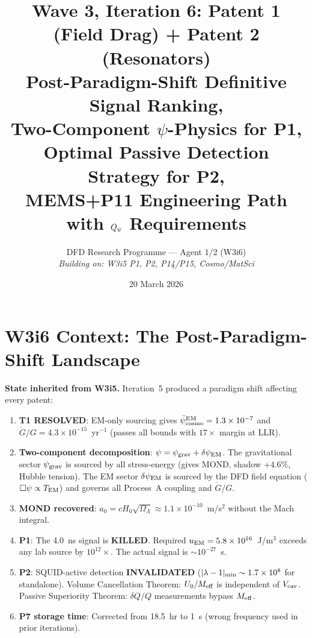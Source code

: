 \documentclass[11pt]{article}
\title{Wave 3, Iteration 6: Patent 1 (Field Drag) + Patent 2 (Resonators)\\
\large Post-Paradigm-Shift Definitive Signal Ranking,\\
Two-Component $\psi$-Physics for P1,\\
Optimal Passive Detection Strategy for P2,\\
MEMS+P11 Engineering Path with $Q_\psi$ Requirements}
\author{DFD Research Programme --- Agent 1/2 (W3i6)\\
\textit{Building on: W3i5 P1, P2, P14/P15, Cosmo/MatSci}}
\date{20 March 2026}
\newcommand{\lam}{\lambda}
\newcommand{\Meff}{M_{\rm eff}}
\newcommand{\ee}[1]{\times 10^{#1}}
\newcommand{\Vcav}{V_{\rm cav}}
\newcommand{\lbone}{|\lam - 1|}
\newcommand{\psicosmo}{\bar{\psi}_{\rm cosmo}}
\newcommand{\psigrav}{\psi_{\rm grav}}
\newcommand{\dpsiEM}{\delta\psi_{\rm EM}}
\theoremstyle{definition}
\theoremstyle{remark}
\begin{document}
\maketitle
\tableofcontents
\newpage

\section*{W3i6 Context: The Post-Paradigm-Shift Landscape}

\noindent\textbf{State inherited from W3i5.}
Iteration~5 produced a paradigm shift affecting every patent:

\begin{enumerate}[nosep]
\item \textbf{T1 RESOLVED}: EM-only sourcing gives
  $\psicosmo^{\rm EM} = 1.3\ee{-7}$ and
  $\dot{G}/G = 4.3\ee{-15}$~yr$^{-1}$ (passes all bounds with $17\times$
  margin at LLR).

\item \textbf{Two-component decomposition}: $\psi = \psigrav + \dpsiEM$.
  The gravitational sector $\psigrav$ is sourced by all stress-energy
  (gives MOND, shadow $+4.6\%$, Hubble tension). The EM sector $\dpsiEM$
  is sourced by the DFD field equation ($\Box\psi \propto T_{\rm EM}$)
  and governs all Process~A coupling and $\dot{G}/G$.

\item \textbf{MOND recovered}: $a_0 = c H_0\sqrt{\Omega_\Lambda} \approx
  1.1\ee{-10}$~m/s$^2$ without the Mach integral.

\item \textbf{P1}: The 4.0~ns signal is \textbf{KILLED}. Required
  $u_{\rm EM} = 5.8\ee{16}$~J/m$^3$ exceeds any lab source by
  $10^{12}\times$. The actual signal is $\sim 10^{-27}$~s.

\item \textbf{P2}: SQUID-active detection \textbf{INVALIDATED}
  ($\lbone_{\rm min} \sim 1.7\ee{8}$ for standalone). Volume Cancellation
  Theorem: $U_0/\Meff$ is independent of $\Vcav$. Passive Superiority
  Theorem: $\delta Q/Q$ measurements bypass $\Meff$.

\item \textbf{P7 storage time}: Corrected from 18.5~hr to 1~s
  (wrong frequency used in prior iterations).
\end{enumerate}
\end{document}
